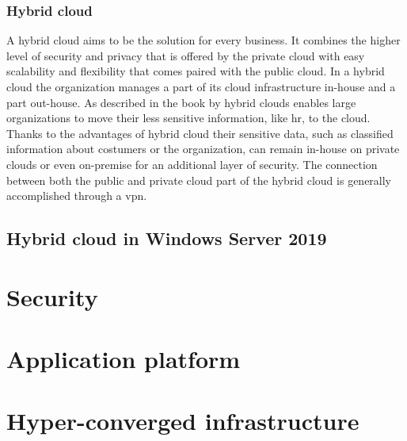 \subsubsection{Hybrid cloud}
A hybrid cloud aims to be the solution for every business. It combines the higher level of security and privacy that is offered by the private cloud with easy scalability and flexibility that comes paired with the public cloud. In a hybrid cloud the organization manages a part of its cloud infrastructure in-house and a part out-house. As described in the book by \textcite{Sarna2010} hybrid clouds enables large organizations to move their less sensitive information, like \acrfull{hr}, to the cloud. Thanks to the advantages of hybrid cloud their sensitive data, such as classified information about costumers or the organization, can remain in-house on private clouds or even on-premise for an additional layer of security. The connection between both the public and private cloud part of the hybrid cloud is generally accomplished through a \acrfull{vpn}.


\subsection{Hybrid cloud in Windows Server 2019}

\section{Security}

\section{Application platform}

\section{Hyper-converged infrastructure}